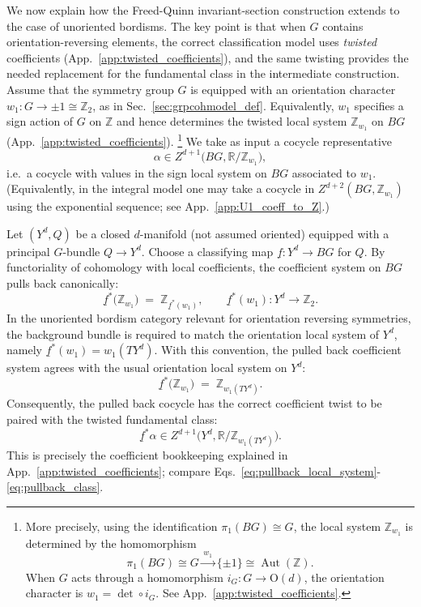 \documentclass[aps,prx,reprint,superscriptaddress,twocolumn,amsmath,amssymb,amsfonts, nofootinbib]{revtex4-2}
\newcommand{\Z}{\mathbb{Z}}
\theoremstyle{apsstyle}
\begin{document}
We now explain how the Freed-Quinn invariant-section construction extends to the case of unoriented bordisms. The key point is that when $G$ contains orientation-reversing elements, the correct classification model uses \emph{twisted} coefficients (App.~\ref{app:twisted_coefficients}), and the same twisting provides the needed replacement for the fundamental class in the intermediate
construction. Assume that the symmetry group $G$ is equipped with an orientation character $w_{1}:G\to {\pm 1}\cong \Z_{2}$, as in Sec.~\ref{sec:grpcohmodel_def}. 
Equivalently, $w_{1}$ specifies a sign action of $G$ on $\Z$ and hence determines the twisted local system $\Z_{w_{1}}$ on $BG$ (App.~\ref{app:twisted_coefficients}). \footnote{More precisely, using the identification $\pi_{1}(BG)\cong G$, the local system $\Z_{w_{1}}$ is determined by
the homomorphism
\begin{equation*}
    \pi_{1}(BG)\cong G
    \xrightarrow{\,w_{1}\,}
    \{\pm1\}
    \cong
    \operatorname{Aut}(\Z).
\end{equation*}
When $G$ acts through a homomorphism $i_{G}:G\to\mathrm O(d)$, the orientation character is
$w_{1}=\det\circ i_{G}$. See App.~\ref{app:twisted_coefficients}.} We take as input a cocycle representative
\begin{equation*}
\alpha\in Z^{d+1}\bigl(BG,\mathbb{R}/\Z_{w_{1}}\bigr),
\end{equation*}
i.e.\ a cocycle with values in the sign local system on $BG$ associated to $w_{1}$. (Equivalently, in the integral model one may take a cocycle in $Z^{d+2}(BG,\Z_{w_{1}})$ using the exponential sequence; see App.~\ref{app:U1_coeff_to_Z}.)

\bigskip

Let $(Y^{d},Q)$ be a closed $d$-manifold (not assumed oriented) equipped with a principal $G$-bundle $Q\to Y^{d}$. Choose a classifying map $\underline f:Y^{d}\to BG$ for $Q$. By functoriality of cohomology with local coefficients, the coefficient system on $BG$ pulls back canonically:
\begin{equation*}
\underline f^{*}\bigl(\Z_{w_{1}}\bigr)\;=\;\Z_{\underline f^{*}(w_{1})},
\qquad
\underline f^{*}(w_{1}):Y^{d}\to \Z_{2}.
\end{equation*}
In the unoriented bordism category relevant for orientation reversing symmetries, the background bundle is required to match the orientation local system of $Y^{d}$, namely $\underline f^{*}(w_{1})=w_{1}(TY^{d})$. With this convention, the pulled back coefficient system agrees with the usual orientation local system on $Y^{d}$:
\begin{equation*}
\underline f^{*}\bigl(\Z_{w_{1}}\bigr)\;=\;\Z_{w_{1}(TY^{d})}.
\end{equation*}
Consequently, the pulled back cocycle has the correct coefficient twist to be paired with the twisted fundamental class:
\begin{equation*}
\underline f^{*}\alpha \in
Z^{d+1}\bigl(Y^{d},\mathbb{R}/\Z_{w_{1}(TY^{d})}\bigr).
\end{equation*}
This is precisely the coefficient bookkeeping explained in App.~\ref{app:twisted_coefficients}; compare Eqs.~\eqref{eq:pullback_local_system}-\eqref{eq:pullback_class}.
\end{document}
